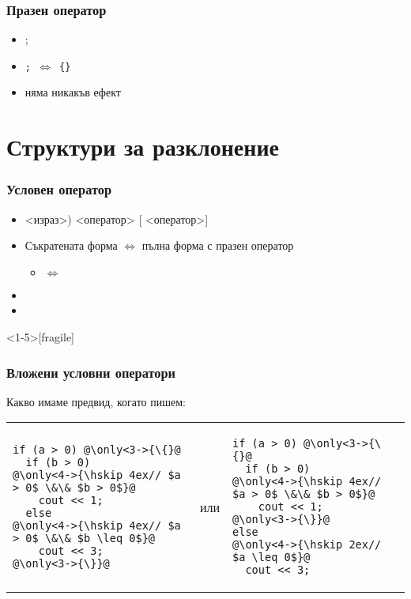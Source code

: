 \documentclass{beamer}
\begin{document}
\begin{frame}
  \frametitle{Празен оператор}
  \begin{itemize}
  \item \tta;
  \item \tt; $\Leftrightarrow$ \tt{\{\}}
  \item няма никакъв ефект
  \end{itemize}
\end{frame}

\section{Структури за разклонение}

\begin{frame}
  \frametitle{Условен оператор}
  
  \begin{itemize}[<+->]
  \item {}<израз>\tta) <оператор> [ <оператор>]
  \item Съкратената форма $\Leftrightarrow$ пълна форма с празен оператор
    \begin{itemize}
    \item {} $\Leftrightarrow$ 
    \end{itemize}
  \item \exa {}
  \item \exa {}
  \end{itemize}
\end{frame}

\begin{frame}<1-5>[fragile]
  \frametitle{Вложени условни оператори}

  Какво имаме предвид, когато пишем:
  \\[1em]
  \pause
  \begin{tabular}{l@{\hskip 12ex}c@{\hskip 12ex}l}
\begin{lstlisting}
if (a > 0) @\only<3->{\{}@
  if (b > 0)
@\only<4->{\hskip 4ex// $a > 0$ \&\& $b > 0$}@
    cout << 1;
  else
@\only<4->{\hskip 4ex// $a > 0$ \&\& $b \leq 0$}@
    cout << 3;
@\only<3->{\}}@
\end{lstlisting}%
    &или&%
\begin{lstlisting}
if (a > 0) @\only<3->{\{}@
  if (b > 0)
@\only<4->{\hskip 4ex// $a > 0$ \&\& $b > 0$}@
    cout << 1;
@\only<3->{\}}@
else
@\only<4->{\hskip 2ex// $a \leq 0$}@
  cout << 3;
\end{lstlisting}
  \end{tabular}
\end{frame}
\end{document}
